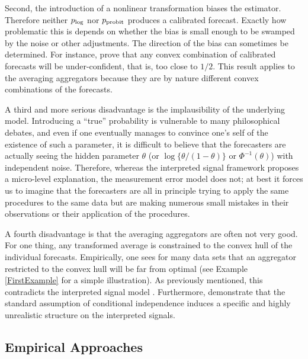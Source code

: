 \documentclass[11pt]{article}
\theoremstyle{definition}
\theoremstyle{definition}
\def\probit{p_{\rm probit}}
\def\plog{p_{\rm log}}
\begin{document}
Second, the introduction of a nonlinear transformation biases the
estimator.  Therefore neither $\plog$ nor $\probit$ produces a
calibrated forecast. Exactly how problematic this is depends on
whether the bias is small enough to be swamped by the noise or other
adjustments.  The direction of the bias can sometimes be
determined. For instance, \citet{Ranjan08} prove that any convex
combination of calibrated forecasts will be under-confident, that is,
too close to $1/2$. This result applies to the averaging aggregators
because they are by nature different convex combinations of the
forecasts.

A third and more serious disadvantage is the implausibility of the
underlying model. Introducing a ``true'' probability is vulnerable to
many philosophical debates, and even if one eventually manages to
convince one's self of the existence of such a parameter, it is
difficult to believe that the forecasters are actually seeing the
hidden parameter $\theta$ (or $\log\{\theta/(1-\theta)\}$ or
$\Phi^{-1}(\theta)$) with independent noise. Therefore, whereas the
interpreted signal framework proposes a micro-level explanation, the
measurement error model does not; at best it forces us to imagine that
the forecasters are all in principle trying to apply the same
procedures to the same data but are making numerous small mistakes in
their observations or their application of the procedures.

A fourth disadvantage is that the averaging aggregators are often not
very good. For one thing, any transformed average is constrained to
the convex hull of the individual forecasts.  Empirically, one sees
for many data sets that an aggregator restricted to the convex hull
will be far from optimal (see Example \ref{FirstExample} for a simple
illustration).  As previously mentioned, this contradicts the
interpreted signal model \cite{parunak2013characterizing}.
Furthermore, \cite{hong2009interpreted} demonstrate that the standard
assumption of conditional independence induces a specific and highly
unrealistic structure on the interpreted signals.

\subsection{Empirical Approaches}
\label{ss:empirical}
\end{document}
